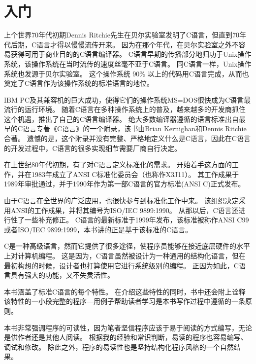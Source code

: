 \chapter{入门}
{
    上个世界70年代初期Dennis Ritchie先生在贝尔实验室发明了C语言，但直到70年代后期，C语言才得以慢慢流传开来。
    因为在那个年代，在贝尔实验室之外不容易获得可用于商业目的的C语言编译器。
    C语言早期的传播部分地归功于Unix操作系统，该操作系统在当时流传的速度丝毫不亚于C语言。
    同C语言一样，Unix操作系统也发源于贝尔实验室。
    这个操作系统 $90\%$ 以上的代码用C语言完成，从而也奠定了C语言作为该操作系统的标准语言的地位。

    IBM PC及其兼容机的巨大成功，使得它们的操作系统MS=DOS很快成为C语言最流行的运行环境。
    随着C语言在多种操作系统上的普及，越来越多的开发商抓住这个机遇，推出了自己的C语言编译器。
    绝大多数编译器遵循的语言标准出自最早的C语言专著《C语言》的一个附录，该书由Brian Kernighan和Dennis Ritchie合著。
    遗憾的是，这个附录并没有完整、严格地定义什么是C语言，因此在C语言的开发过程中，C语言的很多实现细节需要厂商自行决定。

    在上世纪80年代初期，有了对C语言定义标准化的需求。
    开始着手这方面的工作，并在1983年成立了ANSI C标准化委员会（也称作X3J11）。
    其工作成果于1989年审批通过，并于1990年作为第一部C语言的官方标准(ANSI C)正式发布。

    由于C语言在全世界的广泛应用，也很快参与到标准化工作中来。
    该组织决定采用ANSI的工作成果，并将其编号为ISO/IEC 9899:1990。
    从那以后，C语言还进行性了一些补充修正。
    C语言的最新标准于1999年发布，该标准被称作ANSI C99或者ISO/IEC 9899:1999，本书讲的正是基于该标准的C语言。

    C是一种高级语言，然而它提供了很多途径，使程序员能够在接近底层硬件的水平上对计算机编程。
    这是因为，C语言虽然被设计为一种通用的结构化语言，但在最初构想的时候，设计者也打算使用它进行系统级别的编程。
    正因为如此，C语言具有强大的功能，又不失灵活性。

    本书涵盖了标准C语言的每个特性。
    在介绍这些特性的同时，书中还会附上诠释该特性的一小段完整的程序---用例子帮助读者学习是本书写作过程中遵循的一条原则。

    本书非常强调程序的可读性，因为笔者坚信程序应该于易于阅读的方式编写，无论是供作者还是其他人阅读。
    根据我的经验和常识判断，易读的程序也容易编写、调试和修改。
    除此之外，程序的易读性也是坚持结构化程序风格的一个自然结果。
}

\cleardoublepage

\endinput
